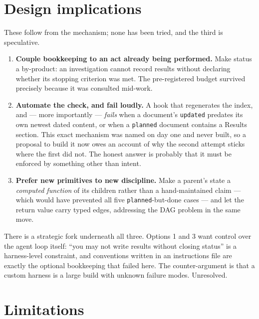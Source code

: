 \documentclass[11pt]{article}
\begin{document}
\section{Design implications}

These follow from the mechanism; none has been tried, and the third is
speculative.

\begin{enumerate}[topsep=3pt,itemsep=2pt]
  \item \textbf{Couple bookkeeping to an act already being performed.} Make
        status a by-product: an investigation cannot record results without
        declaring whether its stopping criterion was met. The pre-registered
        budget survived precisely because it was consulted mid-work.
  \item \textbf{Automate the check, and fail loudly.} A hook that
        regenerates the index, and --- more importantly --- \emph{fails}
        when a document's \texttt{updated} predates its own newest dated
        content, or when a \texttt{planned} document contains a Results
        section. This exact mechanism was named on day one and never built,
        so a proposal to build it now owes an account of why the second
        attempt sticks where the first did not. The honest answer is
        probably that it must be enforced by something other than intent.
  \item \textbf{Prefer new primitives to new discipline.} Make a parent's
        state a \emph{computed function} of its children rather than a
        hand-maintained claim --- which would have prevented all five
        \texttt{planned}-but-done cases --- and let the return value carry
        typed edges, addressing the DAG problem in the same move.
\end{enumerate}

\noindent
There is a strategic fork underneath all three. Options 1 and 3 want control
over the agent loop itself: ``you may not write results without closing
status'' is a harness-level constraint, and conventions written in an
instructions file are exactly the optional bookkeeping that failed here. The
counter-argument is that a custom harness is a large build with unknown
failure modes. Unresolved.

\section{Limitations}
\label{sec:limits}
\end{document}

